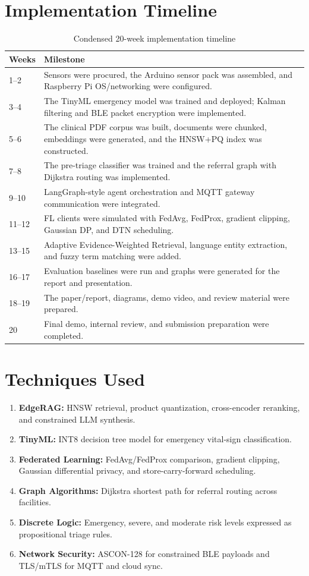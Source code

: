 \documentclass[12pt,a4paper,openany]{report}
\begin{document}
\section{Implementation Timeline}
\begin{table}[H]
\centering
\caption{Condensed 20-week implementation timeline}
\begin{tabularx}{\textwidth}{p{}X}
\toprule
\textbf{Weeks} & \textbf{Milestone}\\
\midrule
1--2 & Sensors were procured, the Arduino sensor pack was assembled, and Raspberry Pi OS/networking were configured.\\
3--4 & The TinyML emergency model was trained and deployed; Kalman filtering and BLE packet encryption were implemented.\\
5--6 & The clinical PDF corpus was built, documents were chunked, embeddings were generated, and the HNSW+PQ index was constructed.\\
7--8 & The pre-triage classifier was trained and the referral graph with Dijkstra routing was implemented.\\
9--10 & LangGraph-style agent orchestration and MQTT gateway communication were integrated.\\
11--12 & FL clients were simulated with FedAvg, FedProx, gradient clipping, Gaussian DP, and DTN scheduling.\\
13--15 & Adaptive Evidence-Weighted Retrieval, language entity extraction, and fuzzy term matching were added.\\
16--17 & Evaluation baselines were run and graphs were generated for the report and presentation.\\
18--19 & The paper/report, diagrams, demo video, and review material were prepared.\\
20 & Final demo, internal review, and submission preparation were completed.\\
\bottomrule
\end{tabularx}
\end{table}

\section{Techniques Used}
\begin{enumerate}
  \item \textbf{EdgeRAG:} HNSW retrieval, product quantization, cross-encoder reranking, and constrained LLM synthesis.
  \item \textbf{TinyML:} INT8 decision tree model for emergency vital-sign classification.
  \item \textbf{Federated Learning:} FedAvg/FedProx comparison, gradient clipping, Gaussian differential privacy, and store-carry-forward scheduling.
  \item \textbf{Graph Algorithms:} Dijkstra shortest path for referral routing across facilities.
  \item \textbf{Discrete Logic:} Emergency, severe, and moderate risk levels expressed as propositional triage rules.
  \item \textbf{Network Security:} ASCON-128 for constrained BLE payloads and TLS/mTLS for MQTT and cloud sync.
\end{enumerate}
\end{document}
